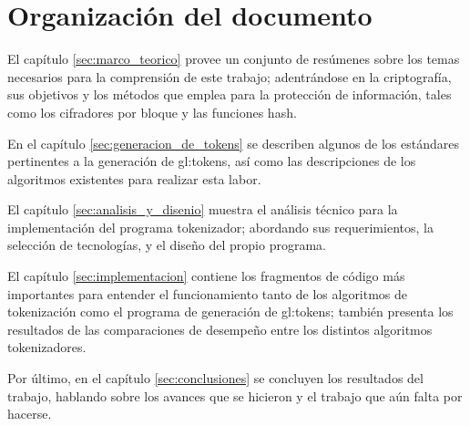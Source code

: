 \section{Organización del documento}

El capítulo \ref{sec:marco_teorico} provee un conjunto de resúmenes sobre los
temas necesarios para la comprensión de este trabajo; adentrándose en la
criptografía, sus objetivos y los métodos que emplea para la protección de
información, tales como los cifradores por bloque y las funciones hash.

En el capítulo \ref{sec:generacion_de_tokens} se describen algunos de los
estándares pertinentes a la generación de \glspl{gl:token}, así como las
descripciones de los algoritmos existentes para realizar esta labor.

El capítulo \ref{sec:analisis_y_disenio} muestra el análisis técnico para
la implementación del programa tokenizador; abordando sus requerimientos,
la selección de tecnologías, y el diseño del propio programa.

El capítulo \ref{sec:implementacion} contiene los fragmentos de código más
importantes para entender el funcionamiento tanto de los algoritmos de
tokenización como el programa de generación de \glspl{gl:token}; también
presenta los resultados de las comparaciones de desempeño entre los
distintos algoritmos tokenizadores.

Por último, en el capítulo \ref{sec:conclusiones} se concluyen los resultados
del trabajo, hablando sobre los avances que se hicieron y el trabajo que aún
falta por hacerse.

